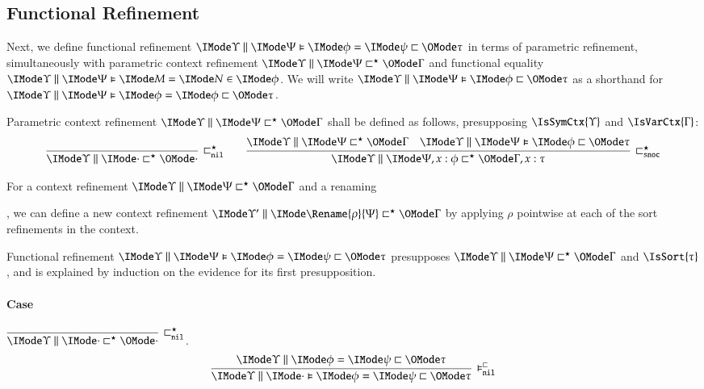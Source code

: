 \documentclass[11pt]{article}
\theoremstyle{definition}
\theoremstyle{notation}
\theoremstyle{remark}
\numberwithin{equation}{section}
\begin{document}
\subsection{Functional Refinement}

\newcommand\RefinesCtxNil{\sqsubset^\star_{\mathtt{nil}}}
\newcommand\RefinesCtxSnoc{\sqsubset^\star_{\mathtt{snoc}}}
\newcommand\PFunRefNil{\vDash^\sqsubset_{\mathtt{nil}}}
\newcommand\PFunRefSnoc{\vDash^\sqsubset_{\mathtt{snoc}}}

Next, we define functional refinement
$\FEqRefines{\Upsilon}{\Psi}{\phi}{\psi}{\tau}$ in terms of parametric refinement,
simultaneously with parametric context refinement
$\RefinesCtx{\Upsilon}{\Psi}{\Gamma}$ and functional equality
$\FRMemEq{\Upsilon}{\Psi}{M}{N}{\phi}$. We will write
$\FRefines{\Upsilon}{\Psi}{\phi}{\tau}$ as a shorthand for
$\FEqRefines{\Upsilon}{\Psi}{\phi}{\phi}{\tau}$.

\newcommand\DefRefinesCtxNil[1]{
  \infer[\RefinesCtxNil]{
    \RefinesCtx{#1}{\cdot}{\cdot}
  }{
  }
}
\newcommand\DefRefinesCtxSnoc[6]{
  \infer[\RefinesCtxSnoc]{
    \RefinesCtx{#1}{#2,#3:#4}{#5,#3:#6}
  }{
    \RefinesCtx{#1}{#2}{#5} &
    \FRefines{#1}{#2}{#4}{#6}
  }
}

Parametric context refinement $\RefinesCtx{\Upsilon}{\Psi}{\Gamma}$ shall be
defined as follows, presupposing $\IsSymCtx{\Upsilon}$ and
$\IsVarCtx{\Gamma}$:
\begin{gather*}
  \DefRefinesCtxNil{\Upsilon}\qquad
  \DefRefinesCtxSnoc{\Upsilon}{\Psi}{x}{\phi}{\Gamma}{\tau}
\end{gather*}

For a context refinement $\RefinesCtx{\Upsilon}{\Psi}{\Gamma}$ and a renaming
, we can define a new context refinement
$\RefinesCtx{\Upsilon'}{\Rename{\rho}{\Psi}}{\Gamma}$ by applying $\rho$ pointwise at
each of the sort refinements in the context.

Functional refinement $\FEqRefines{\Upsilon}{\Psi}{\phi}{\psi}{\tau}$ presupposes
$\RefinesCtx{\Upsilon}{\Psi}{\Gamma}$ and $\IsSort{\tau}$, and is explained by
induction on the evidence for its first presupposition.

\paragraph{Case} $\DefRefinesCtxNil{\Upsilon}$.
\[
  \infer[\PFunRefNil]{
    \FEqRefines{\Upsilon}{\cdot}{\phi}{\psi}{\tau}
  }{
    \EqRefines{\Upsilon}{\phi}{\psi}{\tau}
  }
\]
\end{document}
